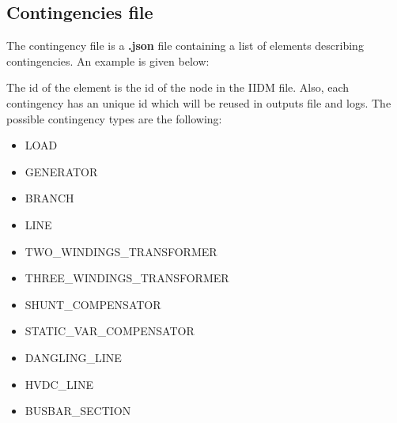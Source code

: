 \documentclass[a4paper, 12pt]{report}
\begin{document}
\subsection{Contingencies file}

The contingency file is a \textbf{.json} file containing a list of elements describing contingencies. An example is given below:


The id of the element is the id of the node in the IIDM file.
Also, each contingency has an unique id which will be reused in outputs file and logs.
The possible contingency types are the following:
\begin{itemize}
  \item LOAD
  \item GENERATOR
  \item BRANCH
  \item LINE
  \item TWO\_WINDINGS\_TRANSFORMER
  \item THREE\_WINDINGS\_TRANSFORMER
  \item SHUNT\_COMPENSATOR
  \item STATIC\_VAR\_COMPENSATOR
  \item DANGLING\_LINE
  \item HVDC\_LINE
  \item BUSBAR\_SECTION
\end{itemize}
\end{document}
